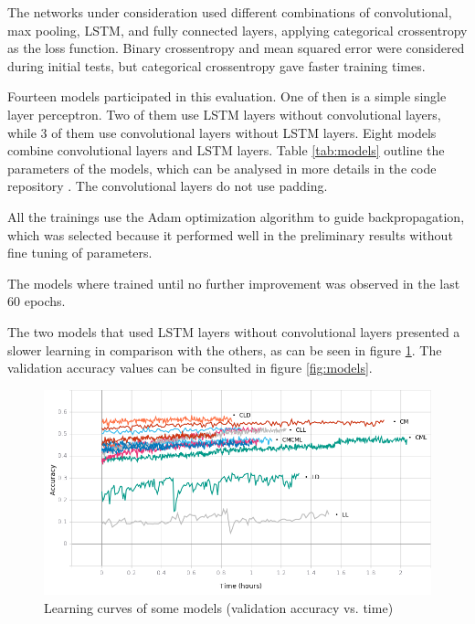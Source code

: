 The networks under consideration used different combinations of convolutional, max pooling, LSTM, and fully connected layers,
applying categorical crossentropy as the loss function. Binary crossentropy and mean squared error were considered during initial tests, but categorical crossentropy gave faster training times.

Fourteen models participated in this evaluation. One of then is a simple single layer perceptron. Two of them use LSTM layers without convolutional layers, while 3 of them use convolutional layers without LSTM layers. Eight models combine convolutional layers and LSTM layers. Table \ref{tab:models} outline the parameters of the models, which can be analysed in more details in the code repository . The convolutional layers do not use padding. 



All the trainings use the Adam \cite{kingma_adam:_2014}
optimization algorithm to guide backpropagation, which was selected because it performed well in the preliminary results without fine tuning of parameters.

The models where trained until no further improvement was observed in the last 60 epochs. 

The two models that used LSTM layers without convolutional layers presented a slower learning in comparison with the others, as can be seen in figure \ref{fig:learning}. The validation accuracy values can be consulted in figure \ref{fig:models}.

\noindent
\begin{figure}[htb!]
\centering\includegraphics[width=1.0\textwidth]{content/epoch_val_categorical_accuracy.png}
\caption{\label{fig:learning}Learning curves of some models (validation accuracy vs. time)}%
\end{figure}

